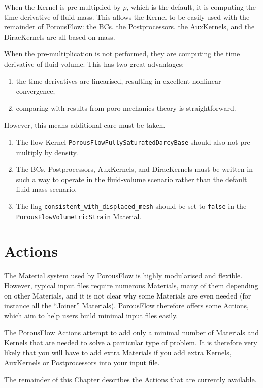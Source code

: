 \documentclass[12pt]{report}
\begin{document}
When the Kernel is pre-multiplied by $\rho$, which is the default,
it is computing the time derivative of fluid mass.  This allows
the Kernel to be easily used with the remainder of PorousFlow: the
BCs, the Postprocessors, the AuxKernels, and the DiracKernels are all
based on mass.

When the pre-multiplication is not performed, they are computing the
time derivative of fluid volume.  This has two great advantages:
\begin{enumerate}
\item the time-derivatives are linearised, resulting in excellent
  nonlinear convergence;
\item comparing with results from poro-mechanics theory is
  straightforward.
\end{enumerate}
However, this means additional care must be taken.
\begin{enumerate}
\item The flow Kernel {\tt PorousFlowFullySaturatedDarcyBase} should
  also not pre-multiply by density.
\item The BCs, Postprocessors, AuxKernels, and DiracKernels must be
  written in such a way to operate in the fluid-volume scenario rather
  than the default fluid-mass scenario.
\item The flag {\tt consistent\_with\_displaced\_mesh} should be set
  to {\tt false} in the {\tt PorousFlowVolumetricStrain} Material.
\end{enumerate}


\chapter{Actions}

The Material system used by PorousFlow is highly modularised and
flexible.  However, typical input files require numerous Materials,
many of them depending on other Materials, and it is not clear why
some Materials are even needed (for instance all the ``Joiner''
Materials).  PorousFlow therefore offers some Actions, which aim to
help users build minimal input files easily.

The PorousFlow Actions attempt to add only a minimal number of
Materials and Kernels that are needed to solve a particular type of
problem.  It is therefore very likely that you will have to add extra
Materials if you add extra Kernels, AuxKernels or Postprocessors into
your input file.

The remainder of this Chapter describes the Actions that are currently
available.
\end{document}
